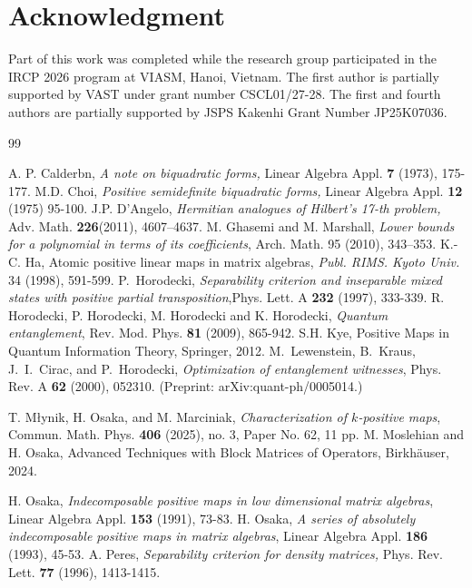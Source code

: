 \documentclass[12pt,a4paper]{amsart}
\theoremstyle{plain}
\theoremstyle{remark}
\theoremstyle{definition}
\begin{document}
\section*{Acknowledgment} Part of this work was completed while the research group participated in the IRCP 2026 program at VIASM, Hanoi, Vietnam.
The first author is partially supported by VAST under grant number CSCL01/27-28. The first and fourth authors are partially supported by JSPS Kakenhi Grant Number JP25K07036.

\begin{thebibliography}{99}
	
	 A. P. Calderbn, \textit{A note on biquadratic forms,} Linear Algebra Appl. \textbf{7} (1973), 175-177.
	 M.D. Choi, \textit{Positive semidefinite biquadratic forms,} Linear Algebra Appl. \textbf{12} (1975) 95-100.
	 J.P. D’Angelo,  \textit{Hermitian analogues of Hilbert’s 17-th problem,} Adv. Math. \textbf{226}(2011), 4607–4637.
	 M. Ghasemi and M. Marshall, \textit{Lower bounds for a polynomial in terms of its coefficients}, Arch. Math. 95 (2010), 343–353.
	 K.-C. Ha, Atomic positive linear maps in matrix algebras, \textit{Publ. RIMS.
Kyoto Univ.} 34 (1998), 591-599.
	 P.~Horodecki, \emph{Separability criterion and inseparable mixed states with positive partial transposition},Phys. Lett. A \textbf{232} (1997), 333-339.
	 R. Horodecki, P. Horodecki, M. Horodecki and K. Horodecki, \textit{Quantum entanglement}, Rev. Mod. Phys. \textbf{81} (2009), 865-942.
	 S.H. Kye, Positive Maps in Quantum Information Theory, Springer, 2012.
	 M.~Lewenstein, B.~Kraus, J.~I.~Cirac, and P.~Horodecki, \emph{Optimization of entanglement witnesses}, Phys. Rev. A \textbf{62} (2000), 052310. (Preprint: arXiv:quant-ph/0005014.)
	
	 T. M{\l}ynik, H. Osaka, and M. Marciniak, \emph{Characterization of $k$-positive maps}, Commun. Math. Phys. \textbf{406} (2025), no. 3, Paper No. 62, 11 pp.
	 M. Moslehian and H. Osaka, Advanced Techniques with Block Matrices of Operators, Birkh{\"a}user, 2024.
	
	 H. Osaka, \textit{Indecomposable positive maps in low dimensional matrix algebras}, Linear Algebra Appl. \textbf{153} (1991), 73-83.
	 H. Osaka, \textit{A series of absolutely indecomposable positive maps in matrix algebras}, Linear Algebra Appl. \textbf{186} (1993), 45-53.
	  A. Peres, \textit{Separability criterion for density matrices,} Phys. Rev. Lett. \textbf{77} (1996), 1413-1415.
	

\end{thebibliography}
\end{document}
